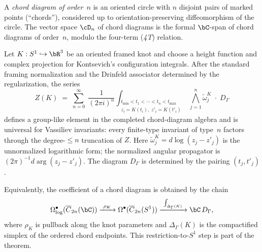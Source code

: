 \begin{definition}
\label{def:chord-diagram}
A \emph{chord diagram of order~$n$} is an oriented circle with
$n$ disjoint pairs of marked points (``chords''), considered up to
orientation-preserving diffeomorphism of the circle. The vector
space $\cD_n$ of chord diagrams is the formal $\bC$-span of
chord diagrams of order~$n$, modulo the four-term
(\emph{4T}) relation.
\end{definition}

\begin{theorem}
\label{thm:kontsevich-invariant}
Let $K:S^1\hookrightarrow \bR^3$ be an oriented framed knot and choose
a height function and complex projection for Kontsevich's
configuration integrals.  After the standard framing normalization
and the Drinfeld associator determined by the regularization, the series
\[
Z(K) \;=\;
\sum_{n=0}^\infty \;
\frac{1}{(2\pi i)^n}
\int_{\substack{t_{\min} < t_1 < \cdots < t_n < t_{\max} \\
 z_i = K(t_i),\; z'_i = K(t'_i)}}
\bigwedge_{j=1}^n
\widetilde\omega^K_{j}
\;\cdot\; D_\Gamma
\]
defines a group-like element in the completed chord-diagram algebra
and is universal for Vassiliev invariants: every finite-type invariant
of type~$n$ factors through the degree-$\leq n$ truncation of $Z$.
Here $\widetilde\omega^K_{j}=d\log(z_j-z'_j)$ is the unnormalized
logarithmic form; the normalized angular propagator is
$(2\pi)^{-1}d\arg(z_j-z'_j)$.  The diagram $D_\Gamma$ is determined
by the pairing $(t_j,t'_j)$.

Equivalently, the coefficient of a chord diagram is obtained by the
chain
\[
\Omega^\bullet_{\log}(\overline{C}_{2n}(\bC))
\xrightarrow{\ \rho_K\ }
\Omega^\bullet(\overline{C}_{2n}(S^1))
\xrightarrow{\ \int_{\Delta_\Gamma(K)}\ }
\bC\,D_\Gamma ,
\]
where $\rho_K$ is pullback along the knot parameters and
$\Delta_\Gamma(K)$ is the compactified simplex of the ordered chord
endpoints.  This restriction-to-$S^1$ step is part of the theorem.
\end{theorem}

